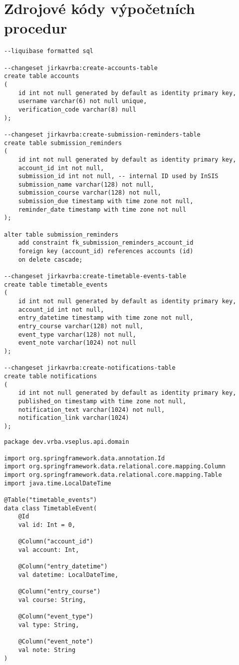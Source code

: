 \chapter{Zdrojové kódy výpočetních procedur}

\begin{lstlisting}[label={code:liquibase-changelog}, caption={SQL soubor s migracemi pro nástroj Liquibase (vlastní zpracování)}]
--liquibase formatted sql

--changeset jirkavrba:create-accounts-table
create table accounts
(
    id int not null generated by default as identity primary key,
    username varchar(6) not null unique,
    verification_code varchar(8) null
);

--changeset jirkavrba:create-submission-reminders-table
create table submission_reminders
(
    id int not null generated by default as identity primary key,
    account_id int not null,
    submission_id int not null, -- internal ID used by InSIS
    submission_name varchar(128) not null,
    submission_course varchar(128) not null,
    submission_due timestamp with time zone not null,
    reminder_date timestamp with time zone not null
);

alter table submission_reminders
    add constraint fk_submission_reminders_account_id 
    foreign key (account_id) references accounts (id) 
    on delete cascade;

--changeset jirkavrba:create-timetable-events-table
create table timetable_events
(
    id int not null generated by default as identity primary key,
    account_id int not null,
    entry_datetime timestamp with time zone not null,
    entry_course varchar(128) not null,
    event_type varchar(128) not null,
    event_note varchar(1024) not null
);

--changeset jirkavrba:create-notifications-table
create table notifications
(
    id int not null generated by default as identity primary key,
    published_on timestamp with time zone not null,
    notification_text varchar(1024) not null,
    notification_link varchar(1024)
);
\end{lstlisting}

\begin{lstlisting}[label={code:timetable-event-domain-class}, caption={Zdrojový kód doménové třídy \code{TimetableEvent}}]
package dev.vrba.vseplus.api.domain

import org.springframework.data.annotation.Id
import org.springframework.data.relational.core.mapping.Column
import org.springframework.data.relational.core.mapping.Table
import java.time.LocalDateTime

@Table("timetable_events")
data class TimetableEvent(
    @Id
    val id: Int = 0,

    @Column("account_id")
    val account: Int,

    @Column("entry_datetime")
    val datetime: LocalDateTime,

    @Column("entry_course")
    val course: String,

    @Column("event_type")
    val type: String,

    @Column("event_note")
    val note: String
)
\end{lstlisting}

